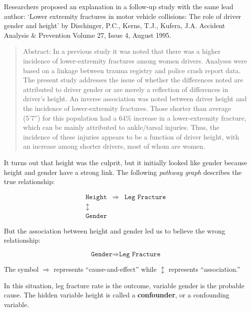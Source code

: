 \documentclass[11pt, chapterprefix=true]{scrbook}\usepackage[]{graphicx}\usepackage[]{color}
\begin{document}
Researchers proposed an explanation in a follow-up study with the same lead author: `Lower extremity fractures in motor vehicle collisions: The role of driver gender and height' by Dischinger, P.C., Kerns, T.J., Kufera, J.A. Accident Analysis \& Prevention Volume 27, Issue 4, August 1995.

\begin{quotation}
Abstract: In a previous study it was noted that there was a higher incidence of lower-extremity fractures among women drivers. Analyses were based on a linkage between trauma registry and police crash report data. The present study addresses the issue of whether the differences noted are attributed to driver gender or are merely a reflection of differences in driver's height. An inverse association was noted between driver height and the incidence of lower-extremity fractures. Those shorter than average (5'7'') for this population had a 64\% increase in a lower-extremity fracture, which can be mainly attributed to ankle/tarsal injuries. Thus, the incidence of these injuries appears to be a function of driver height, with an increase among shorter drivers, most of whom are women.
\end{quotation}  \citep{dischinger1995}

It turns out that height was the culprit, but it initially looked like gender because height and gender have a strong link.  The following \textit{pathway graph} describes the true relationship:

\begin{eqnarray*}
\texttt{Height} & \Rightarrow & \texttt{Leg Fracture} \\
\updownarrow &  & \\
\texttt{Gender} & &
\end{eqnarray*}

But the association between height and gender led us to believe the wrong relationship:

$$ \texttt{Gender} \Rightarrow  \texttt{Leg Fracture} $$

The symbol $\Rightarrow$ represents ``cause-and-effect'' while $\updownarrow$      represents ``association.''

In this situation, leg fracture rate is the outcome, variable gender is the probable cause.  The hidden variable height is called a \textbf{confounder}, or a confounding variable.

\end{document}
